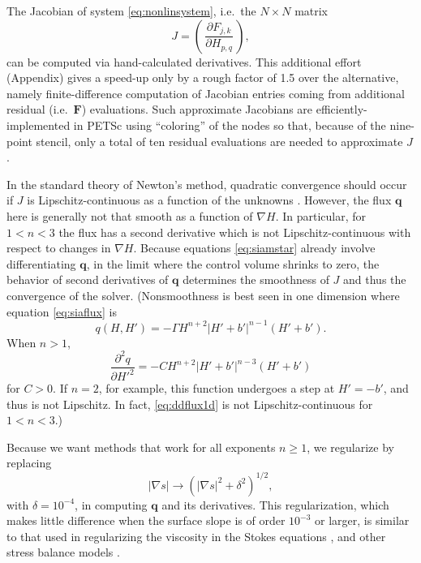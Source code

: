 \documentclass[review,letterpaper]{igs}
\newcommand\bq{\mathbf{q}}
\newcommand\bF{\mathbf{F}}
\newcommand{\grad}{\nabla}
\begin{document}
The Jacobian of system \eqref{eq:nonlinsystem}, i.e.~the $N\times N$ matrix
\begin{equation}
J = \left(\,\frac{\partial F_{j,k}}{\partial H_{p,q}}\,\right), \label{eq:nonlinjacobian}
\end{equation}
can be computed via hand-calculated derivatives.  This additional effort (Appendix) gives a speed-up only by a rough factor of 1.5 over the alternative, namely finite-difference computation of Jacobian entries coming from additional residual (i.e.~$\bF$) evaluations.  Such approximate Jacobians are efficiently-implemented in PETSc using ``coloring'' of the nodes \citep{CurtisPowellReid1974} so that, because of the nine-point stencil, only a total of ten residual evaluations are needed to approximate $J$.

In the standard theory of Newton's method, quadratic convergence should occur if $J$ is Lipschitz-continuous as a function of the unknowns \citep{Kelley2003}.  However, the flux $\bq$ here is generally not that smooth as a function of $\grad H$.  In particular, for $1<n<3$ the flux has a second derivative which is not Lipschitz-continuous with respect to changes in $\grad H$.  Because equations \eqref{eq:siamstar} already involve differentiating $\bq$, in the limit where the control volume shrinks to zero, the behavior of second derivatives of $\bq$ determines the smoothness of $J$ and thus the convergence of the solver.  (Nonsmoothness is best seen in one dimension where equation \eqref{eq:siaflux} is
\begin{equation}
q(H,H') = - \Gamma H^{n+2} \left|H'+b'\right|^{n-1} (H'+b'). \label{eq:flux1d}
\end{equation}
When $n>1$,
\begin{equation}
\frac{\partial^2 q}{\partial H'^2} = - C H^{n+2} \left|H'+b'\right|^{n-3} (H'+b') \label{eq:ddflux1d}
\end{equation}
for $C>0$.  If $n=2$, for example, this function undergoes a step at $H'=-b'$, and thus is not Lipschitz.  In fact, \eqref{eq:ddflux1d} is not Lipschitz-continuous for $1<n<3$.)

Because we want methods that work for all exponents $n\ge 1$, we regularize by replacing
\begin{equation}
|\grad s| \to \left(|\grad s|^2 + \delta^2\right)^{1/2}, \label{eq:nonlinregularization}
\end{equation}
with $\delta = 10^{-4}$, in computing $\bq$ and its derivatives.  This regularization, which makes little difference when the surface slope is of order $10^{-3}$ or larger, is similar to that used in regularizing the viscosity in the Stokes equations \citep{GreveBlatter2009}, and other stress balance models \citep[for example]{BrownSmithAhmadia2013,BuelerBrown2009}.
\end{document}
